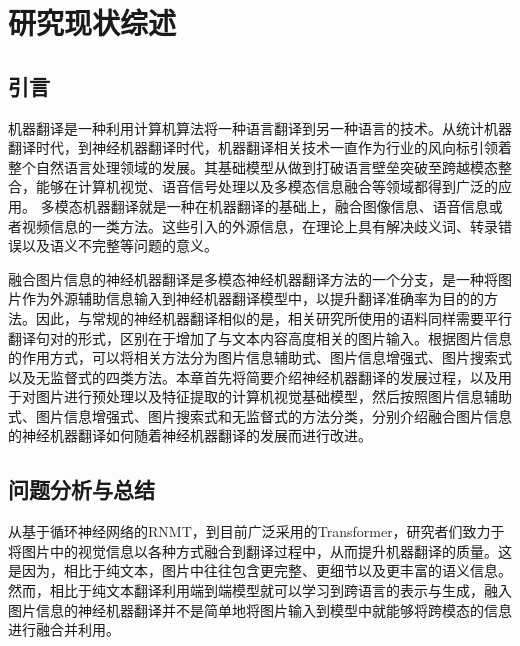 \chapter{研究现状综述}\label{chap:relatedwork}

\section{引言}
机器翻译是一种利用计算机算法将一种语言翻译到另一种语言的技术。从统计机器翻译时代，到神经机器翻译时代，机器翻译相关技术一直作为行业的风向标引领着整个自然语言处理领域的发展。其基础模型从做到打破语言壁垒突破至跨越模态整合，能够在计算机视觉、语音信号处理以及多模态信息融合等领域都得到广泛的应用。
多模态机器翻译就是一种在机器翻译的基础上，融合图像信息、语音信息或者视频信息的一类方法。这些引入的外源信息，在理论上具有解决歧义词、转录错误以及语义不完整等问题的意义。

融合图片信息的神经机器翻译是多模态神经机器翻译方法的一个分支，是一种将图片作为外源辅助信息输入到神经机器翻译模型中，以提升翻译准确率为目的的方法。因此，与常规的神经机器翻译相似的是，相关研究所使用的语料同样需要平行翻译句对的形式，区别在于增加了与文本内容高度相关的图片输入。根据图片信息的作用方式，可以将相关方法分为图片信息辅助式、图片信息增强式、图片搜索式以及无监督式的四类方法。本章首先将简要介绍神经机器翻译的发展过程，以及用于对图片进行预处理以及特征提取的计算机视觉基础模型，然后按照图片信息辅助式、图片信息增强式、图片搜索式和无监督式的方法分类，分别介绍融合图片信息的神经机器翻译如何随着神经机器翻译的发展而进行改进。




%
%
%



\section{问题分析与总结}
从基于循环神经网络的RNMT，到目前广泛采用的Transformer，研究者们致力于将图片中的视觉信息以各种方式融合到翻译过程中，从而提升机器翻译的质量。这是因为，相比于纯文本，图片中往往包含更完整、更细节以及更丰富的语义信息。然而，相比于纯文本翻译利用端到端模型就可以学习到跨语言的表示与生成，融入图片信息的神经机器翻译并不是简单地将图片输入到模型中就能够将跨模态的信息进行融合并利用。


